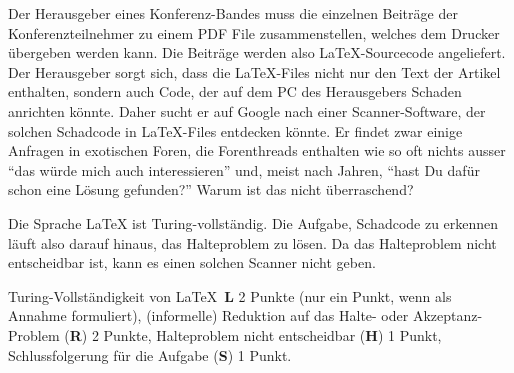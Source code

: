 Der Herausgeber eines Konferenz-Bandes muss die einzelnen Beiträge der 
Konferenzteilnehmer zu einem PDF File zusammenstellen, welches dem Drucker
übergeben werden kann.
Die Beiträge werden also \LaTeX-Sourcecode angeliefert.
Der Herausgeber sorgt sich, dass die \LaTeX-Files nicht nur den Text
der Artikel enthalten, sondern auch Code, der auf dem PC des Herausgebers
Schaden anrichten könnte.
Daher sucht er auf Google nach einer Scanner-Software, der solchen Schadcode  in
\LaTeX-Files entdecken könnte.
Er findet zwar einige Anfragen in exotischen Foren, die Forenthreads
enthalten wie so oft nichts ausser ``das würde mich auch interessieren'' und,
meist nach Jahren, ``hast Du dafür schon eine Lösung gefunden?''
Warum ist das nicht überraschend?

\begin{loesung}
Die Sprache \LaTeX{} ist Turing-vollständig.
Die Aufgabe, Schadcode zu erkennen läuft also darauf hinaus, das Halteproblem
zu lösen.
Da das Halteproblem nicht entscheidbar ist, kann es einen solchen Scanner
nicht geben.
\end{loesung}

\begin{bewertung}
Turing-Vollständigkeit von \LaTeX~{\bf L} 2 Punkte (nur ein Punkt, wenn
als Annahme formuliert),
(informelle) Reduktion auf das Halte- oder Akzeptanz-Problem ({\bf R}) 2 Punkte,
Halteproblem nicht entscheidbar ({\bf H}) 1 Punkt,
Schlussfolgerung für die Aufgabe ({\bf S}) 1 Punkt.
\end{bewertung}

